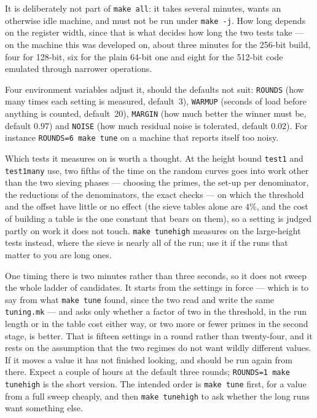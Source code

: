 \documentclass[12pt,a4paper,oneside]{amsart}
\begin{document}
It is deliberately not part of \texttt{make all}: it takes several minutes,
wants an otherwise idle machine, and must not be run under \texttt{make -j}.
How long depends on the register width, since that is what decides how long the
two tests take --- on the machine this was developed on, about three minutes
for the 256-bit build, four for 128-bit, six for the plain 64-bit one and eight
for the 512-bit code emulated through narrower operations.

Four environment variables adjust it, should the defaults not suit:
\texttt{ROUNDS} (how many times each setting is measured, default~$3$),
\texttt{WARMUP} (seconds of load before anything is counted, default~$20$),
\texttt{MARGIN} (how much better the winner must be, default $0.97$) and
\texttt{NOISE} (how much residual noise is tolerated, default $0.02$). For
instance \texttt{ROUNDS=6 make tune} on a machine that reports itself too
noisy.

Which tests it measures on is worth a thought. At the height bound
\texttt{test1} and \texttt{test1many} use, two fifths of the time on the random
curves goes into work other than the two sieving phases --- choosing the
primes, the set-up per denominator, the reductions of the denominators, the
exact checks --- on which the threshold and the offset have little or no
effect (the sieve tables alone are $4\%$, and the cost of building a table is
the one constant that bears on them), so a setting is judged partly on work it
does not touch. \texttt{make tunehigh} measures on the large-height tests
instead, where the sieve is nearly
all of the run; use it if the runs that matter to you are long ones.

One timing there is two minutes rather than three seconds, so it does not sweep
the whole ladder of candidates. It starts from the settings in force --- which
is to say from what \texttt{make tune} found, since the two read and write the
same \texttt{tuning.mk} --- and asks only whether a factor of two in the
threshold, in the run length or in the table cost either way, or two more or
fewer primes in the second stage, is better. That is fifteen settings in a
round rather than twenty-four,
and it rests on the assumption that the two regimes do not want wildly
different values. If it moves a value it has not finished looking, and should
be run again from there. Expect a couple of hours at the default three rounds;
\texttt{ROUNDS=1 make tunehigh} is the short version. The intended order is
\texttt{make tune} first, for a value from a full sweep cheaply, and then
\texttt{make tunehigh} to ask whether the long runs want something else.
\end{document}
